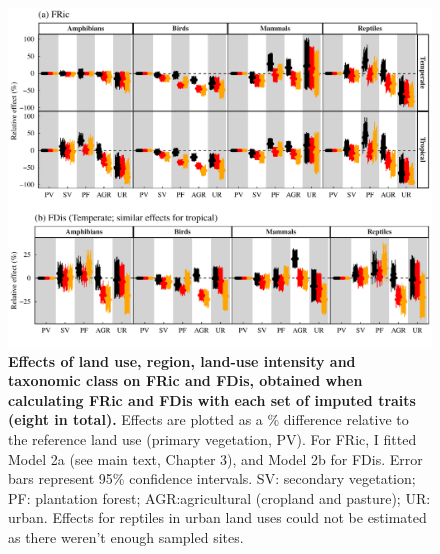 \begin{figure}[h!]
\centering
\includegraphics[scale=0.7]{Supporting/Chapter3/Figures/Figure_SI_23}
\caption[Effects of land use, region, land-use intensity and taxonomic class on FRic and FDis, obtained when calculating FRic and FDis with each set of imputed traits]{\textbf{Effects of land use, region, land-use intensity and taxonomic class on FRic and FDis, obtained when calculating FRic and FDis with each set of imputed traits (eight in total).} Effects are plotted as a \% difference relative to the reference land use (primary vegetation, PV). For FRic, I fitted Model 2a (see main text, Chapter 3), and Model 2b for FDis. Error bars represent 95\% confidence intervals. SV: secondary vegetation; PF: plantation forest; AGR:agricultural (cropland and pasture); UR: urban. Effects for reptiles in urban land uses could not be estimated as there weren’t enough sampled sites.}
\label{SI3_F24}
\end{figure}


